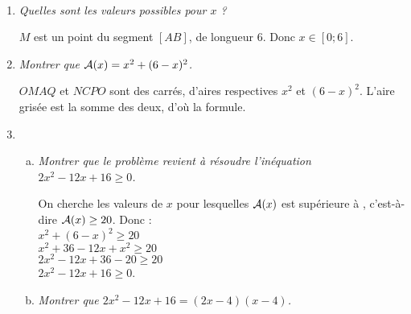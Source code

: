 \documentclass[11pt]{article}
\begin{document}
\begin{exercice}[Problème]~

  \begin{multicols}{2}
  \begin{center}
  \end{center}

    \begin{enumerate}[(1)]
      \item \emph{Quelles sont les valeurs possibles pour $x$ ?}
        
        $M$ est un point du segment $[AB]$, de longueur 6. Donc $x\in[0;6]$.
    \end{enumerate}
  \end{multicols}
    \begin{enumerate}[(1)]
        \setcounter{enumi}{1}
      \item \emph{Montrer que ${\cal A}(x)=x^2+(6-x)^2$.}
        
        $OMAQ$ et $NCPO$ sont des carrés, d'aires respectives $x^2$ et $(6-x)^2$. L'aire grisée est la somme des deux, d'où la formule.
      \item \begin{enumerate}[(a)]
          \item \emph{Montrer que le problème revient à résoudre l'inéquation $2x^2-12x+16\geq0$.}
            
            On cherche les valeurs de $x$ pour lesquelles ${\cal A}(x)$ est supérieure à , c'est-à-dire ${\cal A}(x)\geq20$.  
            Donc :\\
            $x^2+(6-x)^2\geq20$\\
            $x^2+36-12x+x^2\geq20$\\
            $2x^2-12x+36-20\geq20$\\
            $2x^2-12x+16\geq0$.
          \item \emph{Montrer que $2x^2-12x+16=(2x-4)(x-4)$.}


\end{enumerate}
\end{enumerate}
\end{exercice}
\end{document}
